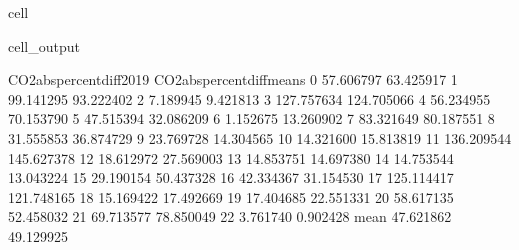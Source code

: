 \documentclass[letterpaper,10pt,english]{jupyterBook}
\begin{document}
\begin{sphinxuseclass}{cell}
\begin{sphinxVerbatimOutput}
\begin{sphinxuseclass}{cell_output}
\begin{sphinxVerbatim}[commandchars=\\\{\}]
      CO2\PYGZus{}abs\PYGZus{}percent\PYGZus{}diff\PYGZus{}2019  CO2\PYGZus{}abs\PYGZus{}percent\PYGZus{}diff\PYGZus{}means  \PYGZbs{}
0                     57.606797                   63.425917   
1                     99.141295                   93.222402   
2                      7.189945                    9.421813   
3                    127.757634                  124.705066   
4                     56.234955                   70.153790   
5                     47.515394                   32.086209   
6                      1.152675                   13.260902   
7                     83.321649                   80.187551   
8                     31.555853                   36.874729   
9                     23.769728                   14.304565   
10                    14.321600                   15.813819   
11                   136.209544                  145.627378   
12                    18.612972                   27.569003   
13                    14.853751                   14.697380   
14                    14.753544                   13.043224   
15                    29.190154                   50.437328   
16                    42.334367                   31.154530   
17                   125.114417                  121.748165   
18                    15.169422                   17.492669   
19                    17.404685                   22.551331   
20                    58.617135                   52.458032   
21                    69.713577                   78.850049   
22                     3.761740                    0.902428   
mean                  47.621862                   49.129925   


\end{sphinxVerbatim}
\end{sphinxuseclass}
\end{sphinxVerbatimOutput}
\end{sphinxuseclass}
\end{document}
